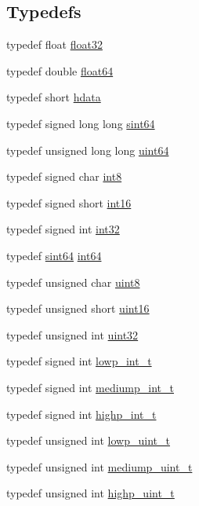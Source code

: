 \subsection*{Typedefs}
\begin{DoxyCompactItemize}
\item 
typedef float \mbox{\hyperlink{namespaceglm_1_1detail_ad60558c5c304624de0b54c51b5857737}{float32}}
\item 
typedef double \mbox{\hyperlink{namespaceglm_1_1detail_a5a0a9a1be3fd5dbe6d47ae45c3022b06}{float64}}
\item 
typedef short \mbox{\hyperlink{namespaceglm_1_1detail_aa2115f7dd38e14fea7ba9e95104120f3}{hdata}}
\item 
typedef signed long long \mbox{\hyperlink{namespaceglm_1_1detail_aa9fd5478f3e347aa0b2d1a8bf3408544}{sint64}}
\item 
typedef unsigned long long \mbox{\hyperlink{namespaceglm_1_1detail_adec4b19bf4982125e122db2fe03c5810}{uint64}}
\item 
typedef signed char \mbox{\hyperlink{namespaceglm_1_1detail_a04b526a8d7a9b455602a0afa78c531e0}{int8}}
\item 
typedef signed short \mbox{\hyperlink{namespaceglm_1_1detail_a375938874ca4f0a0982ec6373b56117b}{int16}}
\item 
typedef signed int \mbox{\hyperlink{namespaceglm_1_1detail_a9f85b4efeca416cdcec2fd08939a2e17}{int32}}
\item 
typedef \mbox{\hyperlink{namespaceglm_1_1detail_aa9fd5478f3e347aa0b2d1a8bf3408544}{sint64}} \mbox{\hyperlink{namespaceglm_1_1detail_a5b1c3227ec636c24a0676746381adfc8}{int64}}
\item 
typedef unsigned char \mbox{\hyperlink{namespaceglm_1_1detail_aef2588f97d090cc19fbbe0c74fe17c8f}{uint8}}
\item 
typedef unsigned short \mbox{\hyperlink{namespaceglm_1_1detail_a47b2a7d006d187338e8031a352d1ce56}{uint16}}
\item 
typedef unsigned int \mbox{\hyperlink{namespaceglm_1_1detail_ade6cfbf377022aaa391af8cd50489222}{uint32}}
\item 
typedef signed int \mbox{\hyperlink{namespaceglm_1_1detail_a030a8128e369fc1f9c7982dc68a78ba7}{lowp\+\_\+int\+\_\+t}}
\item 
typedef signed int \mbox{\hyperlink{namespaceglm_1_1detail_aede0757f19204d1d44f716b3dd66d13c}{mediump\+\_\+int\+\_\+t}}
\item 
typedef signed int \mbox{\hyperlink{namespaceglm_1_1detail_a74c48e9deafcc33db998a4ee62da8d6e}{highp\+\_\+int\+\_\+t}}
\item 
typedef unsigned int \mbox{\hyperlink{namespaceglm_1_1detail_ad59c4581ad8ce0c3ef6146edaa7e15dc}{lowp\+\_\+uint\+\_\+t}}
\item 
typedef unsigned int \mbox{\hyperlink{namespaceglm_1_1detail_a98f572e92099cc1b5740f1ccf1c80f8d}{mediump\+\_\+uint\+\_\+t}}
\item 
typedef unsigned int \mbox{\hyperlink{namespaceglm_1_1detail_a994c05c8a976cc902a7cd193ad36bbba}{highp\+\_\+uint\+\_\+t}}
\end{DoxyCompactItemize}
